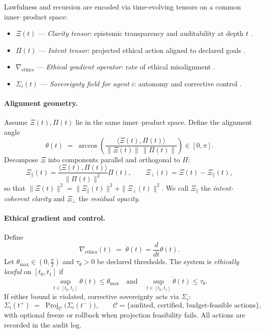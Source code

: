 \documentclass[12pt]{amsart}
\theoremstyle{plain}
\begin{document}
Lawfulness and recursion are encoded via time-evolving tensors on a common inner–product space:
\begin{itemize}
  \item $\Xi(t)$ — \emph{Clarity tensor}: epistemic transparency and auditability at depth $t$ \cite{vanosdol2025tensors}.
  \item $\Pi(t)$ — \emph{Intent tensor}: projected ethical action aligned to declared goals \cite{zidek2025spiral}.
  \item $\nabla_{\!\text{ethics}}$ — \emph{Ethical gradient operator}: rate of ethical misalignment \cite{gibson2025unification}.
  \item $\Sigma_i(t)$ — \emph{Sovereignty field for agent $i$}: autonomy and corrective control \cite{boatright2025recursive}.
\end{itemize}

\paragraph{Alignment geometry.}
Assume $\Xi(t),\Pi(t)$ lie in the same inner–product space. Define the alignment angle
\[
\theta(t)\;=\;\arccos\!\left(\frac{\langle \Xi(t),\Pi(t)\rangle}{\|\Xi(t)\|\,\|\Pi(t)\|}\right)\in[0,\pi].
\]
Decompose $\Xi$ into components parallel and orthogonal to $\Pi$:
\[
\Xi_{\parallel}(t)=\frac{\langle \Xi(t),\Pi(t)\rangle}{\|\Pi(t)\|^{2}}\Pi(t),\qquad
\Xi_{\perp}(t)=\Xi(t)-\Xi_{\parallel}(t),
\]
so that $\|\Xi(t)\|^{2}=\|\Xi_{\parallel}(t)\|^{2}+\|\Xi_{\perp}(t)\|^{2}$. We call
$\Xi_{\parallel}$ the \emph{intent-coherent clarity} and $\Xi_{\perp}$ the \emph{residual opacity}.

\paragraph{Ethical gradient and control.}
Define
\[
\nabla_{\!\text{ethics}}(t)\;=\;\dot{\theta}(t)=\frac{d}{dt}\theta(t).
\]
Let $\theta_{\max}\in(0,\tfrac{\pi}{2})$ and $\tau_\theta>0$ be declared thresholds. The system is \emph{ethically lawful} on $[t_0,t_1]$ if
\[
\sup_{t\in[t_0,t_1]}\theta(t)\le\theta_{\max}
\quad\text{and}\quad
\sup_{t\in[t_0,t_1]} \dot{\theta}(t)\le\tau_\theta.
\]
If either bound is violated, corrective sovereignty acts via $\Sigma_i$:
\[
\Sigma_i(t^+)\;=\;\operatorname{Proj}_{\mathcal{C}}\!\big(\Sigma_i(t^-)\big),\qquad
\mathcal{C}=\{\text{audited, certified, budget-feasible actions}\},
\]
with optional freeze or rollback when projection feasibility fails. All actions are recorded in the audit log.
\end{document}
